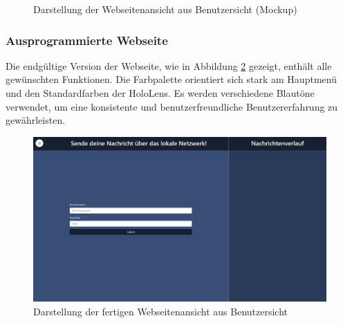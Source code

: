 \begin{figure}[H]
\centering
{}
\caption{Darstellung der Webseitenansicht aus Benutzersicht (Mockup)}
\label{fig:protfrontend}
\end{figure}

\subsubsection*{Ausprogrammierte Webseite}
Die endgültige Version der Webseite, wie in Abbildung \ref{fig:frontend} gezeigt, enthält alle gewünschten Funktionen. Die Farbpalette orientiert sich stark am Hauptmenü und den Standardfarben der HoloLens. Es werden verschiedene Blautöne verwendet, um eine konsistente und benutzerfreundliche Benutzererfahrung zu gewährleisten.

\begin{figure}[H]
\centering
\includegraphics[width=1\textwidth]{images/frontend.png}
\caption{Darstellung der fertigen Webseitenansicht aus Benutzersicht}
\label{fig:frontend}
\end{figure}


